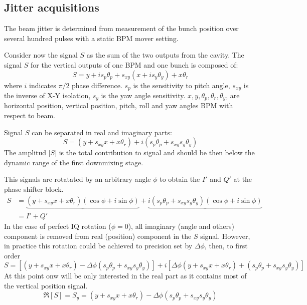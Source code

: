 \subsection{Jitter acquisitions}
The beam jitter is determined from measurement of the bunch position over several hundred pulses with a static BPM mover setting.\par
Consider now the signal $S$ as the sum of the two outputs from the cavity. The signal $S$ for the vertical outputs of one BPM and one bunch is composed of:
\begin{equation}
S = y+is_p\theta_p+s_{xy}(x+is_y\theta_y)+x\theta_r
\end{equation}
where $i$ indicates $\pi/2$ phase difference. $s_p$ is the sensitivity to pitch angle, $s_{xy}$ is the inverse of X-Y isolation, $s_y$ is the yaw angle sensitivity. $x,y,\theta_p,\theta_r,\theta_y$, are horizontal position, vertical position, pitch, roll and yaw angles BPM with respect to beam.\par
Signal $S$ can be separated in real and imaginary parts:
\begin{equation}
S = (y+s_{xy}x+x\theta_r)+i(s_p\theta_p+s_{xy}s_y\theta_y)
\end{equation}
The amplitud $|S|$ is the total contribution to signal and should be then below the dynamic range of the first downmixing stage.\par
This signals are rotatated by an arbitrary angle $\phi$ to obtain the $I'$ and $Q'$ at the phase shifter block.
\begin{align*}
S &= \underbrace{(y+s_{xy}x+x\theta_r)(\cos\phi+i\sin\phi)}+\underbrace{i(s_p\theta_p+s_{xy}s_y\theta_y)(\cos\phi+i\sin\phi)}\\
  &= I' + Q' 
\end{align*}
In the case of perfect IQ rotation ($\phi=0$), all imaginary (angle and others) component is removed from real (position) component in the $S$ signal. However, in practice this rotation could be achieved to precision set by $\Delta\phi$, then, to first order
\begin{equation}
S=[(y+s_{xy}x+x\theta_r)-\Delta\phi(s_p\theta_p+s_{xy}s_y\theta_y)]+i[\Delta\phi(y+s_{xy}x+x\theta_r)+(s_p\theta_p+s_{xy}s_y\theta_y)]
\end{equation}
At this point onw will be only interested in the real part as it contains most of the vertical position signal.
\begin{equation}
 \Re[S]=S_y = (y+s_{xy}x+x\theta_r)-\Delta\phi(s_p\theta_p+s_{xy}s_y\theta_y)
\end{equation}
